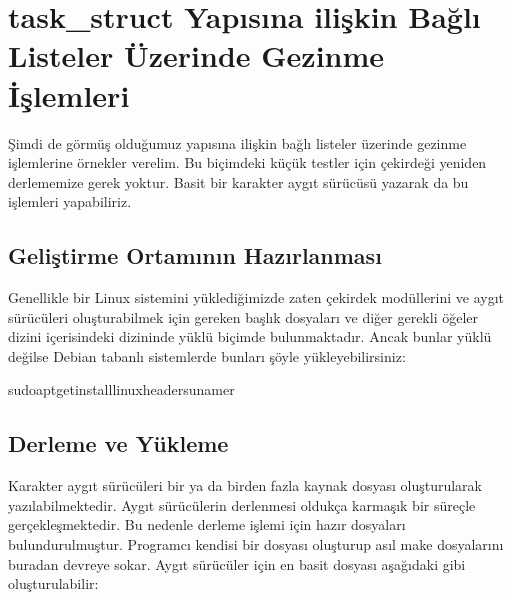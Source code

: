 \documentclass[a4paper,10pt,turkish]{sphinxmanual}
\begin{document}
\section{task\_struct Yapısına ilişkin Bağlı Listeler Üzerinde Gezinme İşlemleri}
\label{\detokenize{processcontrolblock:task-struct-yapisina-iliskin-bagli-listeler-uzerinde-gezinme-islemleri}}
\sphinxAtStartPar
Şimdi de görmüş olduğumuz  yapısına ilişkin bağlı listeler üzerinde gezinme işlemlerine
örnekler verelim. Bu biçimdeki küçük testler için çekirdeği yeniden derlememize gerek yoktur. Basit bir
karakter aygıt sürücüsü yazarak da bu işlemleri yapabiliriz.


\subsection{Geliştirme Ortamının Hazırlanması}
\label{\detokenize{processcontrolblock:gelistirme-ortaminin-hazirlanmasi}}
\sphinxAtStartPar
Genellikle bir Linux sistemini yüklediğimizde zaten çekirdek modüllerini ve aygıt sürücüleri
oluşturabilmek için gereken başlık dosyaları ve diğer gerekli öğeler  dizini içerisindeki
 dizininde yüklü biçimde bulunmaktadır. Ancak bunlar yüklü değilse Debian
tabanlı sistemlerde bunları şöyle yükleyebilirsiniz:

\begin{sphinxVerbatim}[commandchars=\\\{\}]
\PYGZdl{}sudoapt\PYGZhy{}getinstalllinux\PYGZhy{}headers\PYGZhy{}uname\PYGZhy{}r
\end{sphinxVerbatim}


\subsection{Derleme ve Yükleme}
\label{\detokenize{processcontrolblock:derleme-ve-yukleme}}
\sphinxAtStartPar
Karakter aygıt sürücüleri bir ya da birden fazla kaynak  dosyası oluşturularak yazılabilmektedir.
Aygıt sürücülerin derlenmesi oldukça karmaşık bir süreçle gerçekleşmektedir. Bu nedenle derleme işlemi
için hazır  dosyaları bulundurulmuştur. Programcı kendisi bir  dosyası oluşturup
asıl make dosyalarını buradan devreye sokar. Aygıt sürücüler için en basit  dosyası aşağıdaki
gibi oluşturulabilir:
\end{document}
